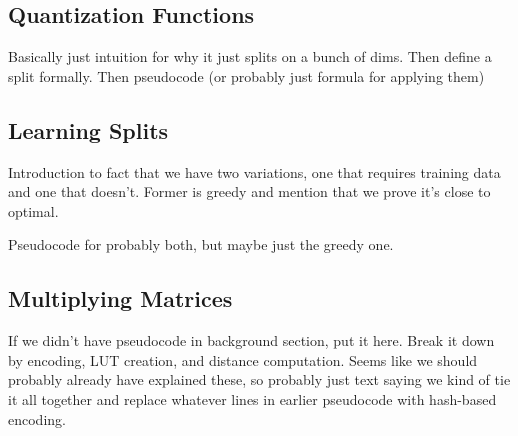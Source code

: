 \subsection{Quantization Functions}

Basically just intuition for why it just splits on a bunch of dims. Then define a split formally. Then pseudocode (or probably just formula for applying them)

\subsection{Learning Splits}

Introduction to fact that we have two variations, one that requires training data and one that doesn't. Former is greedy and mention that we prove it's close to optimal.

Pseudocode for probably both, but maybe just the greedy one.

\subsection{Multiplying Matrices}

If we didn't have pseudocode in background section, put it here. Break it down by encoding, LUT creation, and distance computation. Seems like we should probably already have explained these, so probably just text saying we kind of tie it all together and replace whatever lines in earlier pseudocode with hash-based encoding.


